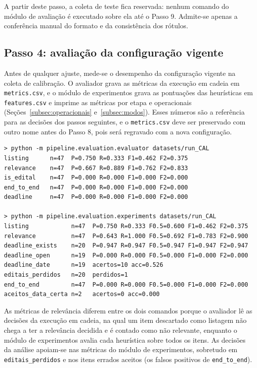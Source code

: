 A partir deste passo, a coleta de teste fica reservada: nenhum comando do
módulo de avaliação é executado sobre ela até o Passo 9. Admite-se apenas a
conferência manual do formato e da consistência dos rótulos.

\subsection{Passo 4: avaliação da configuração vigente}

Antes de qualquer ajuste, mede-se o desempenho da configuração vigente na
coleta de calibração. O avaliador grava as métricas da execução em cadeia em
\texttt{metrics.csv}, e o módulo de experimentos grava as pontuações das
heurísticas em \texttt{features.csv} e imprime as métricas por etapa e
operacionais (Seções~\ref{subsec:operacionais} e~\ref{subsec:modos}). Esses
números são a referência para as decisões dos passos seguintes, e o
\texttt{metrics.csv} deve ser preservado com outro nome antes do Passo 8, pois
será regravado com a nova configuração.

\begin{footnotesize}
\begin{verbatim}
> python -m pipeline.evaluation.evaluator datasets/run_CAL
listing      n=47  P=0.750 R=0.333 F1=0.462 F2=0.375
relevance    n=47  P=0.667 R=0.889 F1=0.762 F2=0.833
is_edital    n=47  P=0.000 R=0.000 F1=0.000 F2=0.000
end_to_end   n=47  P=0.000 R=0.000 F1=0.000 F2=0.000
deadline     n=47  P=0.000 R=0.000 F1=0.000 F2=0.000

> python -m pipeline.evaluation.experiments datasets/run_CAL
listing            n=47  P=0.750 R=0.333 F0.5=0.600 F1=0.462 F2=0.375
relevance          n=47  P=0.643 R=1.000 F0.5=0.692 F1=0.783 F2=0.900
deadline_exists    n=20  P=0.947 R=0.947 F0.5=0.947 F1=0.947 F2=0.947
deadline_open      n=19  P=0.000 R=0.000 F0.5=0.000 F1=0.000 F2=0.000
deadline_date      n=19  acertos=10 acc=0.526
editais_perdidos   n=20  perdidos=1
end_to_end         n=47  P=0.000 R=0.000 F0.5=0.000 F1=0.000 F2=0.000
aceitos_data_certa n=2   acertos=0 acc=0.000
\end{verbatim}
\end{footnotesize}

As métricas de relevância diferem entre os dois comandos porque o avaliador lê
as decisões da execução em cadeia, na qual um item descartado como listagem não
chega a ter a relevância decidida e é contado como não relevante, enquanto o
módulo de experimentos avalia cada heurística sobre todos os itens. As
decisões da análise apoiam-se nas métricas do módulo de experimentos,
sobretudo em \texttt{editais\_perdidos} e nos itens errados aceitos (os falsos
positivos de \texttt{end\_to\_end}).

